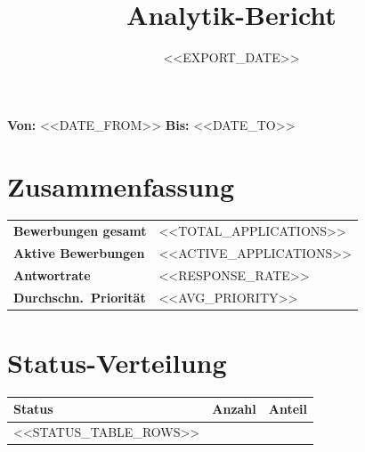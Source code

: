\documentclass[a4paper,11pt]{scrartcl}
\title{Analytik-Bericht}
\date{<<EXPORT_DATE>>}
\begin{document}
\maketitle

\noindent
\textbf{Von:} <<DATE_FROM>>\quad
\textbf{Bis:} <<DATE_TO>>

\vspace{1em}

\section*{Zusammenfassung}

\begin{tabular}{ll}
\textbf{Bewerbungen gesamt}    & <<TOTAL_APPLICATIONS>> \\[0.3em]
\textbf{Aktive Bewerbungen}    & <<ACTIVE_APPLICATIONS>> \\[0.3em]
\textbf{Antwortrate}           & <<RESPONSE_RATE>> \\[0.3em]
\textbf{Durchschn.\ Priorit\"at} & <<AVG_PRIORITY>> \\
\end{tabular}

\vspace{1em}

\section*{Status-Verteilung}

\begin{tabular}{|l|r|r|}
\hline
\textbf{Status} & \textbf{Anzahl} & \textbf{Anteil} \\
\hline
<<STATUS_TABLE_ROWS>>
\hline
\end{tabular}
\end{document}
